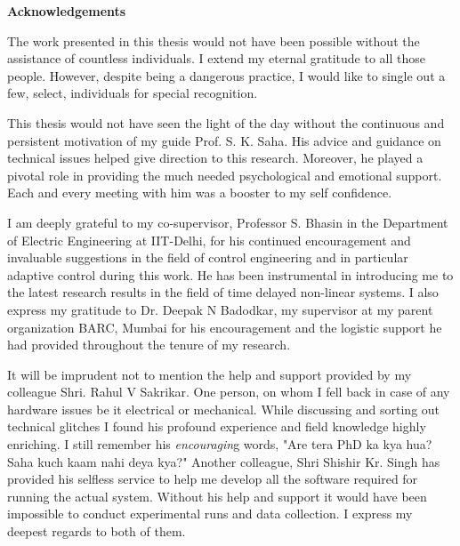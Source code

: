 \doublespacing
\newpage
\thispagestyle{empty}
\mbox{}

\newpage

\begin{center}
\textbf{\Large{Acknowledgements}}
\bigskip
\bigskip
\end{center}

The work presented in this thesis would not have been possible without the assistance
of countless individuals.  I extend my eternal gratitude  to all those people. However, despite being a dangerous practice, I would like to single out a few, select, individuals for special recognition.

 This thesis would not have seen the light of the day without the continuous and persistent motivation of my guide Prof. S. K. Saha. His advice and guidance  on technical  issues helped give direction to this research. Moreover, he played a pivotal role in providing the much needed psychological and emotional support. Each and every meeting with him was a booster to my self confidence. 
 
    
I am deeply grateful to my co-supervisor, Professor S. Bhasin in the Department of Electric Engineering at  IIT-Delhi, for his continued encouragement and invaluable suggestions in the field of control engineering and in particular adaptive control during this work. He has been instrumental in introducing me to the latest research results  in the field of time delayed non-linear systems.  
I also express my gratitude to Dr. Deepak N Badodkar, my supervisor at my parent organization BARC, Mumbai for his encouragement and the logistic support he had provided throughout the tenure of my research.   


It will be imprudent not to mention the help and support provided by my colleague Shri. Rahul V Sakrikar. One person, on whom I fell back in case of any hardware issues be it electrical or mechanical. While discussing and sorting out technical glitches I found his profound experience and field knowledge highly enriching. I still remember his \textit{encouragin}g words, "Are tera PhD ka kya hua? Saha kuch kaam nahi deya kya?" Another colleague, Shri Shishir Kr. Singh has provided his selfless service to help me develop all the software required for running the actual system. Without his help and support it would have been impossible to conduct experimental runs and data collection. I express my deepest regards to both of them.

